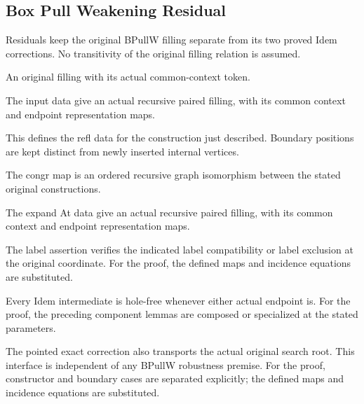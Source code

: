 \subsection{Box Pull Weakening Residual}
Residuals keep the original BPullW filling separate from its two proved Idem corrections. No transitivity of the original filling relation is assumed.

An original filling with its actual common-context token.
\par{}

The input data give an actual recursive paired filling, with its common context and endpoint representation maps.
\par{}

This defines the refl data for the construction just described. Boundary positions are kept distinct from newly inserted internal vertices.
\par{}

The congr map is an ordered recursive graph isomorphism between the stated original constructions.
\par{}

The expand At data give an actual recursive paired filling, with its common context and endpoint representation maps.
\par{}

The label assertion verifies the indicated label compatibility or label exclusion at the original coordinate.
For the proof, the defined maps and incidence equations are substituted.
\par{}

Every Idem intermediate is hole-free whenever either actual endpoint is.
For the proof, the preceding component lemmas are composed or specialized at the stated parameters.
\par{}

The pointed exact correction also transports the actual original search root. This interface is independent of any BPullW robustness premise.
For the proof, constructor and boundary cases are separated explicitly; the defined maps and incidence equations are substituted.
\par{}

